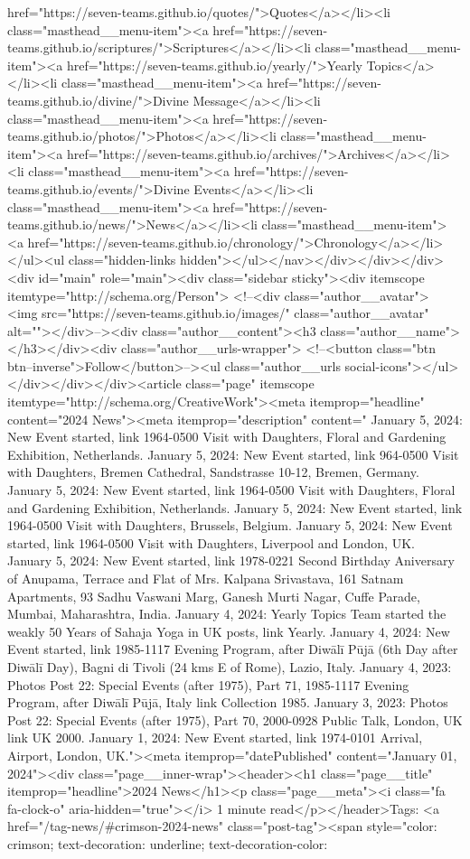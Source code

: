 href="https://seven-teams.github.io/quotes/">Quotes</a></li><li class="masthead__menu-item"><a href="https://seven-teams.github.io/scriptures/">Scriptures</a></li><li class="masthead__menu-item"><a href="https://seven-teams.github.io/yearly/">Yearly Topics</a></li><li class="masthead__menu-item"><a href="https://seven-teams.github.io/divine/">Divine Message</a></li><li class="masthead__menu-item"><a href="https://seven-teams.github.io/photos/">Photos</a></li><li class="masthead__menu-item"><a href="https://seven-teams.github.io/archives/">Archives</a></li><li class="masthead__menu-item"><a href="https://seven-teams.github.io/events/">Divine Events</a></li><li class="masthead__menu-item"><a href="https://seven-teams.github.io/news/">News</a></li><li class="masthead__menu-item"><a href="https://seven-teams.github.io/chronology/">Chronology</a></li></ul><ul class="hidden-links hidden"></ul></nav></div></div></div><div id="main" role="main"><div class="sidebar sticky"><div itemscope itemtype="http://schema.org/Person"> <!--<div class="author__avatar"> <img src="https://seven-teams.github.io/images/" class="author__avatar" alt=""></div>--><div class="author__content"><h3 class="author__name"></h3></div><div class="author__urls-wrapper"> <!--<button class="btn btn--inverse">Follow</button>--><ul class="author__urls social-icons"></ul></div></div></div><article class="page" itemscope itemtype="http://schema.org/CreativeWork"><meta itemprop="headline" content="2024 News"><meta itemprop="description" content=" January 5, 2024: New Event started, link 1964-0500 Visit with Daughters, Floral and Gardening Exhibition, Netherlands. January 5, 2024: New Event started, link 964-0500 Visit with Daughters, Bremen Cathedral, Sandstrasse 10-12, Bremen, Germany. January 5, 2024: New Event started, link 1964-0500 Visit with Daughters, Floral and Gardening Exhibition, Netherlands. January 5, 2024: New Event started, link 1964-0500 Visit with Daughters, Brussels, Belgium. January 5, 2024: New Event started, link 1964-0500 Visit with Daughters, Liverpool and London, UK. January 5, 2024: New Event started, link 1978-0221 Second Birthday Aniversary of Anupama, Terrace and Flat of Mrs. Kalpana Srivastava, 161 Satnam Apartments, 93 Sadhu Vaswani Marg, Ganesh Murti Nagar, Cuffe Parade, Mumbai, Maharashtra, India. January 4, 2024: Yearly Topics Team started the weakly 50 Years of Sahaja Yoga in UK posts, link Yearly. January 4, 2024: New Event started, link 1985-1117 Evening Program, after Diwālī Pūjā (6th Day after Diwālī Day), Bagni di Tivoli (24 kms E of Rome), Lazio, Italy. January 4, 2023: Photos Post 22: Special Events (after 1975), Part 71, 1985-1117 Evening Program, after Diwālī Pūjā, Italy link Collection 1985. January 3, 2023: Photos Post 22: Special Events (after 1975), Part 70, 2000-0928 Public Talk, London, UK link UK 2000. January 1, 2024: New Event started, link 1974-0101 Arrival, Airport, London, UK."><meta itemprop="datePublished" content="January 01, 2024"><div class="page__inner-wrap"><header><h1 class="page__title" itemprop="headline">2024 News</h1><p class="page__meta"><i class="fa fa-clock-o" aria-hidden="true"></i> 1 minute read</p></header>Tags: <a href="/tag-news/#crimson-2024-news" class="post-tag"><span style="color: crimson; text-decoration: underline; text-decoration-color: 